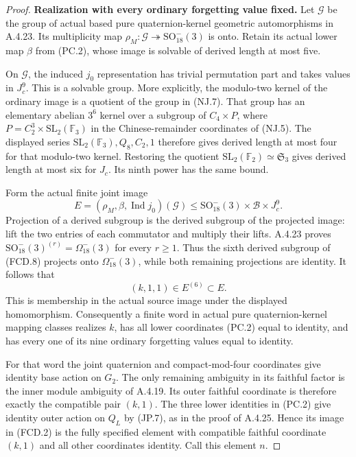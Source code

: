 \begin{proof}
\par\medskip\noindent\textbf{Realization with every ordinary forgetting value fixed.}\quad
Let $\mathcal G$ be the group of actual based pure
quaternion-kernel geometric automorphisms in A.4.23.
Its multiplicity map
$\rho_M:\mathcal G\twoheadrightarrow
\mathrm{SO}_{18}^-(3)$ is onto.  Retain its actual
lower map $\beta$ from (PC.2), whose image is solvable
of derived length at most five.

On $\mathcal G$, the induced $j_0$ representation has
trivial permutation part and takes values in $J_c^9$.
This is a solvable group.  More explicitly, the
modulo-two kernel of the ordinary image is a quotient
of the group in (NJ.7).  That group has an elementary
abelian $3^6$ kernel over a subgroup of $C_4\times P$,
where $P=C_2^3\times\mathrm{SL}_2(\mathbb F_3)$
in the Chinese-remainder coordinates of (NJ.5).
The displayed series
$\mathrm{SL}_2(\mathbb F_3),Q_8,C_2,1$
therefore gives derived length at most four for that
modulo-two kernel.  Restoring the quotient
$\mathrm{SL}_2(\mathbb F_2)\simeq\mathfrak S_3$
gives derived length at most six for $J_c$.
Its ninth power has the same bound.

Form the actual finite joint image
\[
 E=(\rho_M,\beta,\operatorname{Ind}j_0)(\mathcal G)
 \leq\mathrm{SO}_{18}^-(3)\times\mathcal B\times J_c^9.
                                                               \tag{FCD.8}
\]
Projection of a derived subgroup is the derived subgroup
of the projected image: lift the two entries of each
commutator and multiply their lifts.  A.4.23 proves
$\mathrm{SO}_{18}^-(3)^{(r)}=\Omega_{18}^-(3)$ for
every $r\geq1$.  Thus the sixth derived subgroup of
(FCD.8) projects onto $\Omega_{18}^-(3)$, while both
remaining projections are identity.  It follows that
\[
                  (k,1,1)\in E^{(6)}\subset E.
                                                               \tag{FCD.9}
\]
This is membership in the actual source image under
the displayed homomorphism.  Consequently a finite
word in actual pure quaternion-kernel mapping classes
realizes $k$, has all lower coordinates (PC.2) equal
to identity, and has every one of its nine ordinary
forgetting values equal to identity.

For that word the joint quaternion and compact-mod-four
coordinates give identity base action on $G_2$.
The only remaining ambiguity in its faithful factor
is the inner module ambiguity of A.4.19.  Its outer
faithful coordinate is therefore exactly the compatible
pair $(k,1)$.  The three lower identities in (PC.2)
give identity outer action on $Q_L$ by (JP.7), as in
the proof of A.4.25.  Hence its image in (FCD.2) is
the fully specified element with compatible faithful
coordinate $(k,1)$ and all other coordinates identity.
Call this element $n$.


\end{proof}
